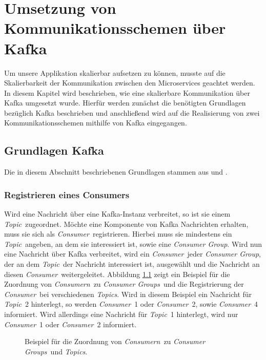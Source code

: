 \chapter{Umsetzung von Kommunikationsschemen über Kafka}
\newcommand{\C}{\textit{Consumer}}
\newcommand{\Cn}{\textit{Consumern}}
\newcommand{\CG}{\textit{Consumer Group}}
\newcommand{\CGs}{\textit{Consumer Groups}}
\newcommand{\T}{\textit{Topic}}
\newcommand{\Tcs}{\textit{Topics}}
\newcommand{\Pt}{\textit{Partition}}
\newcommand{\Pts}{\textit{Partitionen}}
\newcommand{\Pd}{\textit{Producer}}
\newcommand{\Evs}{\textit{Events}}
\newcommand{\Ev}{\textit{Event}}
Um unsere Applikation skalierbar aufsetzen zu können, musste auf die Skalierbarkeit der Kommunikation zwischen den Microservices geachtet werden. In diesem Kapitel wird beschrieben, wie eine skalierbare Kommunikation über Kafka umgesetzt wurde. Hierfür werden zunächst die benötigten Grundlagen bezüglich Kafka beschrieben und anschließend wird auf die Realisierung von zwei Kommunikationsschemen mithilfe von Kafka eingegangen.
\section{Grundlagen Kafka}
Die in diesem Abschnitt beschriebenen Grundlagen stammen aus \cite{KafkaIntro} und \cite{KafkaDoku}.
\subsection{Registrieren eines Consumers}
Wird eine Nachricht über eine Kafka-Instanz verbreitet, so ist sie einem \T\ zugeordnet.
Möchte eine Komponente von Kafka Nachrichten erhalten, muss sie sich als \C\ registrieren. Hierbei muss sie mindestens ein \T\ angeben, an dem sie interessiert ist, sowie eine \CG. Wird nun eine Nachricht über Kafka verbreitet, wird ein \C\ jeder \CG, der an dem \T\ der Nachricht interessiert ist, ausgewählt und die Nachricht an diesen \C\ weitergeleitet. Abbildung \ref{fig:exampleKafkaConsumerRegistration} zeigt ein Beispiel für die Zuordnung von \Cn\ zu \CGs\ und die Registrierung der \C\ bei verschiedenen \Tcs. Wird in diesem Beispiel ein Nachricht für \T\ 2 hinterlegt, so werden \C\ 1 oder \C\ 2, sowie \C\ 4 informiert. Wird allerdings eine Nachricht für \T\ 1 hinterlegt, wird nur \C\ 1 oder \C\ 2 informiert.
\begin{figure}
	\caption{Beispiel für die Zuordnung von \Cn\ zu \CGs\ und \Tcs.}
	\label{fig:exampleKafkaConsumerRegistration}
	\centering
\end{figure}
